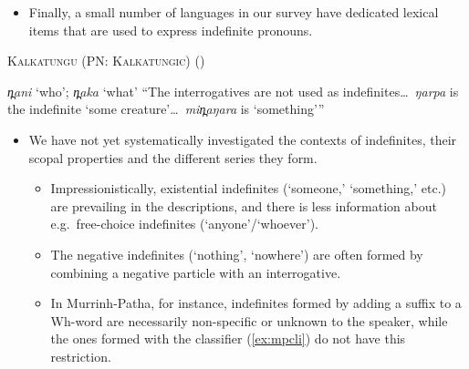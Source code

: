 \documentclass{article}
\begin{document}
\begin{itemize}
    \item Finally, a small number of languages in our survey have dedicated lexical items that are used to express indefinite pronouns.
\end{itemize}

\begin{exe}
  \ex \textsc{Kalkatungu (PN: Kalkatungic)} (\citealt[104--5]{blake79})
  \begin{xlist}
    \ex \textit{\charis n̪ani} `who'; \textit{\charis n̪aka} `what'
    \ex ``The interrogatives are not used as indefinites\ldots\ \textit{\charis ŋarpa} is the indefinite `some creature'\ldots\ \textit{\charis min̪aŋara} is `something'\thinspace''
  \end{xlist}
\end{exe}



\begin{itemize}
\item We have not yet systematically investigated the contexts of indefinites, their scopal properties and the different series they form.
  \begin{itemize}
  \item Impressionistically, existential indefinites (`someone,' `something,' etc.) are prevailing in the descriptions, and there is less information about e.g.\ free-choice indefinites (`anyone'/`whoever').
  \item The negative indefinites (`nothing', `nowhere') are often formed by combining a negative particle with an interrogative.%
  \item In Murrinh-Patha, for instance, indefinites formed by adding a suffix to a Wh-word are necessarily non-specific or unknown to the speaker, while the ones formed with the classifier (\ref{ex:mpcli}) do not have this restriction.
  \end{itemize}
  \end{itemize}


\end{document}
